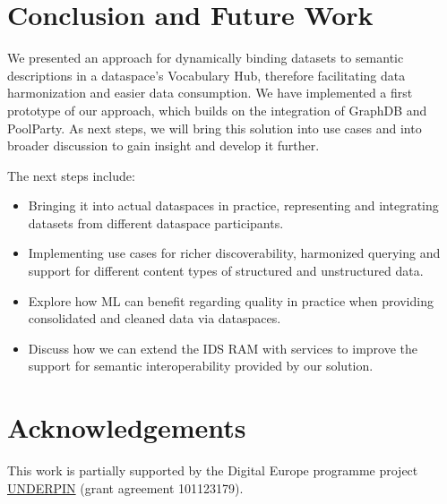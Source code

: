 \documentclass[
  super,
  preprint,
  3p]{elsarticle}
\providecommand{\tightlist}{%
  \setlength{\itemsep}{0pt}\setlength{\parskip}{0pt}}\usepackage{longtable,booktabs,array}
\begin{document}
\section{Conclusion and Future Work}\label{conclusion-and-future-work}

We presented an approach for dynamically binding datasets to semantic
descriptions in a dataspace's Vocabulary Hub, therefore facilitating
data harmonization and easier data consumption. We have implemented a
first prototype of our approach, which builds on the integration of
GraphDB and PoolParty. As next steps, we will bring this solution into
use cases and into broader discussion to gain insight and develop it
further.

The next steps include:

\begin{itemize}
\tightlist
\item
  Bringing it into actual dataspaces in practice, representing and
  integrating datasets from different dataspace participants.
\item
  Implementing use cases for richer discoverability, harmonized querying
  and support for different content types of structured and unstructured
  data.
\item
  Explore how ML can benefit regarding quality in practice when
  providing consolidated and cleaned data via dataspaces.
\item
  Discuss how we can extend the IDS RAM with services to improve the
  support for semantic interoperability provided by our solution.
\end{itemize}

\section{Acknowledgements}\label{acknowledgements}

This work is partially supported by the Digital Europe programme project
\href{https://underpinproject.eu/}{UNDERPIN} (grant agreement
101123179).


\renewcommand\refname{References}
  
\end{document}
